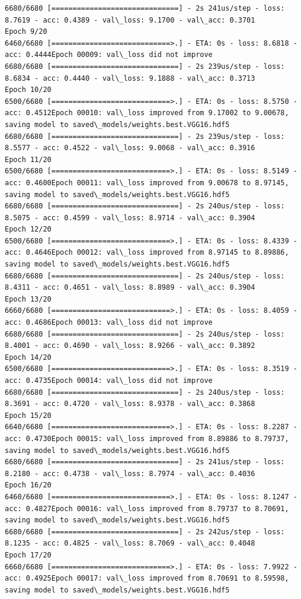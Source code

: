\documentclass[11pt]{article}
\begin{document}
\begin{Verbatim}[commandchars=\\\{\}]
6680/6680 [==============================] - 2s 241us/step - loss: 8.7619 - acc: 0.4389 - val\_loss: 9.1700 - val\_acc: 0.3701
Epoch 9/20
6460/6680 [============================>.] - ETA: 0s - loss: 8.6818 - acc: 0.4444Epoch 00009: val\_loss did not improve
6680/6680 [==============================] - 2s 239us/step - loss: 8.6834 - acc: 0.4440 - val\_loss: 9.1888 - val\_acc: 0.3713
Epoch 10/20
6500/6680 [============================>.] - ETA: 0s - loss: 8.5750 - acc: 0.4512Epoch 00010: val\_loss improved from 9.17002 to 9.00678, saving model to saved\_models/weights.best.VGG16.hdf5
6680/6680 [==============================] - 2s 239us/step - loss: 8.5577 - acc: 0.4522 - val\_loss: 9.0068 - val\_acc: 0.3916
Epoch 11/20
6500/6680 [============================>.] - ETA: 0s - loss: 8.5149 - acc: 0.4600Epoch 00011: val\_loss improved from 9.00678 to 8.97145, saving model to saved\_models/weights.best.VGG16.hdf5
6680/6680 [==============================] - 2s 240us/step - loss: 8.5075 - acc: 0.4599 - val\_loss: 8.9714 - val\_acc: 0.3904
Epoch 12/20
6500/6680 [============================>.] - ETA: 0s - loss: 8.4339 - acc: 0.4646Epoch 00012: val\_loss improved from 8.97145 to 8.89886, saving model to saved\_models/weights.best.VGG16.hdf5
6680/6680 [==============================] - 2s 240us/step - loss: 8.4311 - acc: 0.4651 - val\_loss: 8.8989 - val\_acc: 0.3904
Epoch 13/20
6660/6680 [============================>.] - ETA: 0s - loss: 8.4059 - acc: 0.4686Epoch 00013: val\_loss did not improve
6680/6680 [==============================] - 2s 240us/step - loss: 8.4001 - acc: 0.4690 - val\_loss: 8.9266 - val\_acc: 0.3892
Epoch 14/20
6500/6680 [============================>.] - ETA: 0s - loss: 8.3519 - acc: 0.4735Epoch 00014: val\_loss did not improve
6680/6680 [==============================] - 2s 240us/step - loss: 8.3691 - acc: 0.4720 - val\_loss: 8.9378 - val\_acc: 0.3868
Epoch 15/20
6640/6680 [============================>.] - ETA: 0s - loss: 8.2287 - acc: 0.4730Epoch 00015: val\_loss improved from 8.89886 to 8.79737, saving model to saved\_models/weights.best.VGG16.hdf5
6680/6680 [==============================] - 2s 241us/step - loss: 8.2180 - acc: 0.4738 - val\_loss: 8.7974 - val\_acc: 0.4036
Epoch 16/20
6460/6680 [============================>.] - ETA: 0s - loss: 8.1247 - acc: 0.4827Epoch 00016: val\_loss improved from 8.79737 to 8.70691, saving model to saved\_models/weights.best.VGG16.hdf5
6680/6680 [==============================] - 2s 242us/step - loss: 8.1235 - acc: 0.4825 - val\_loss: 8.7069 - val\_acc: 0.4048
Epoch 17/20
6660/6680 [============================>.] - ETA: 0s - loss: 7.9922 - acc: 0.4925Epoch 00017: val\_loss improved from 8.70691 to 8.59598, saving model to saved\_models/weights.best.VGG16.hdf5

\end{Verbatim}
\end{document}
